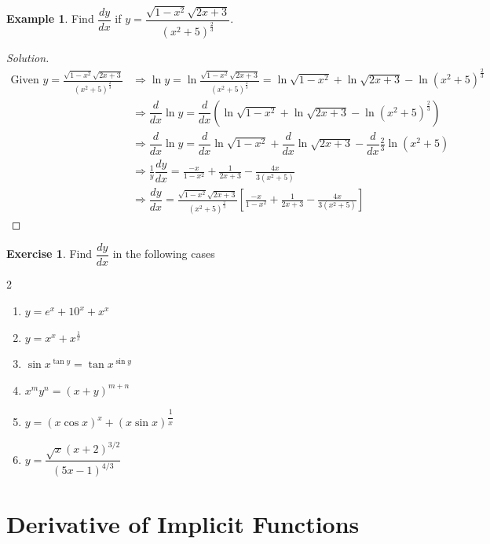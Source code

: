 \documentclass[../../main.tex]{subfiles}
\theoremstyle{definition}
\newtheorem{exercise}{Exercise}[section]
\newtheorem{example}{Example}[section]
\newenvironment{solution}
    {\begin{proof}[Solution]}
    {\end{proof}}
\begin{document}
\begin{example}
Find $\dfrac{dy}{dx}$ if $y=\dfrac{\sqrt{1-x^2}\sqrt{2x+3}}{(x^2+5)^{\frac{2}{3}}}$.
\end{example}

\begin{solution}
\begin{align*}
\text{Given }y=\frac{\sqrt{1-x^2}\sqrt{2x+3}}{(x^2+5)^{\frac{2}{3}}} &\Rightarrow \ln y=\ln \frac{\sqrt{1-x^2}\sqrt{2x+3}}{(x^2+5)^{\frac{2}{3}}} = \ln \sqrt{1-x^2}+\ln \sqrt{2x+3}-\ln {(x^2+5)^{\frac{2}{3}}} \\
&\Rightarrow \dfrac{d}{dx} \ln y=\dfrac{d}{dx}(\ln\sqrt{1-x^2}+\ln \sqrt{2x+3}-\ln {(x^2+5)^{\frac{2}{3}}}) \\
&\Rightarrow \dfrac{d}{dx} \ln y=\dfrac{d}{dx}\ln\sqrt{1-x^2}+\dfrac{d}{dx}\ln \sqrt{2x+3}-\dfrac{d}{dx}\frac{2}{3}\ln (x^2+5) \\ 
&\Rightarrow \frac{1}{y}\dfrac{dy}{dx} = \frac{-x}{1-x^2}+\frac{1}{2x+3}-\frac{4x}{3(x^2+5)} \\
&\Rightarrow \dfrac{dy}{dx} = \frac{\sqrt{1-x^2}\sqrt{2x+3}}{(x^2+5)^{\frac{2}{3}}}\left[\frac{-x}{1-x^2}+\frac{1}{2x+3}-\frac{4x}{3(x^2+5)}\right]
\end{align*}    
\end{solution}


\begin{exercise}
    

Find $\dfrac{dy}{dx}$ in the following cases
\begin{multicols}{2}
\begin{enumerate}
    \item $y=e^x+10^x+x^x$
    \item $y=x^x+x^{\frac{1}{x}}$
    \item $\sin x^{\tan y}=\tan x^{\sin y}$
    \item $x^my^n=(x+y)^{m+n}$ 
    \item $y=(x\cos x)^x+(x\sin x)^{\dfrac{1}{x}}$
    \item $y=\dfrac{\sqrt{x}(x+2)^{3/2}}{(5x-1)^{4/3}}$
    
\end{enumerate}
\end{multicols}
\end{exercise}




\section{Derivative of Implicit Functions}
\end{document}
